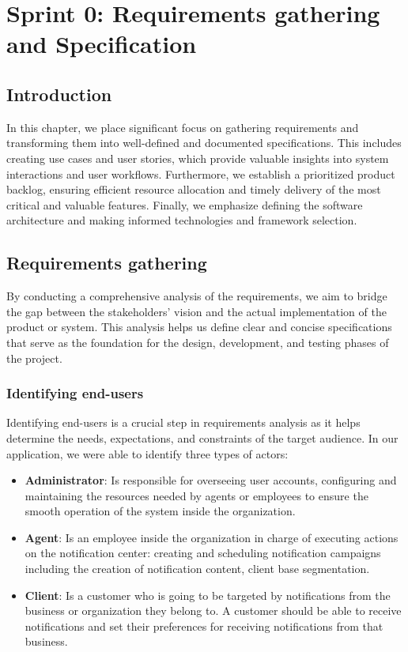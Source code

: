 \chapter{Sprint 0: Requirements gathering and Specification}

\section*{Introduction}
In this chapter, we place significant focus on gathering requirements and transforming them
into well-defined and documented specifications. This includes creating use cases and user stories,
which provide valuable insights into system interactions and user workflows. Furthermore, we establish
a prioritized product backlog, ensuring efficient resource allocation and timely delivery of the most
critical and valuable features. Finally, we emphasize defining the software architecture and making
informed technologies and framework selection.

\section{Requirements gathering}
By conducting a comprehensive analysis of the requirements, we aim to bridge the gap between
the stakeholders' vision and the actual implementation of the product or system.
This analysis helps us define clear and concise specifications that serve as the foundation for the design,
development, and testing phases of the project.

\subsection{Identifying end-users}
Identifying end-users is a crucial step in requirements analysis as it helps determine the needs,
expectations, and constraints of the target audience. In our application, we were able to identify
three types of actors:

\begin{itemize}
      \item \textbf{Administrator}: Is responsible for overseeing user accounts, configuring and maintaining the
            resources needed by agents or employees to ensure the smooth operation of the system inside the organization.

      \item \textbf{Agent}: Is an employee inside the organization in charge of executing actions on the
            notification center: creating and scheduling notification campaigns including the creation of
            notification content, client base segmentation.

      \item \textbf{Client}: Is a customer who is going to be targeted by notifications from the business
            or organization they belong to. A customer should be able to receive notifications and set their
            preferences for receiving notifications from that business.
\end{itemize}

